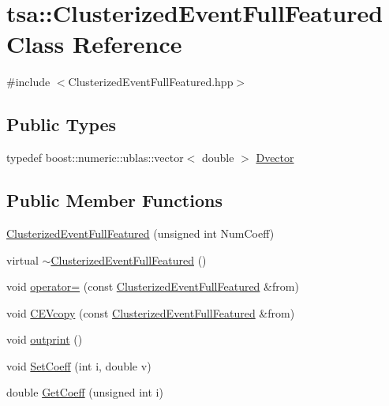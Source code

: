 \hypertarget{classtsa_1_1_clusterized_event_full_featured}{}\section{tsa\+:\+:Clusterized\+Event\+Full\+Featured Class Reference}
\label{classtsa_1_1_clusterized_event_full_featured}


{\ttfamily \#include $<$Clusterized\+Event\+Full\+Featured.\+hpp$>$}

\subsection*{Public Types}
\begin{DoxyCompactItemize}
\item 
typedef boost\+::numeric\+::ublas\+::vector$<$ double $>$ \hyperlink{classtsa_1_1_clusterized_event_full_featured_a3b6ced7b46c6d82cd122cc6c2b5c2178}{Dvector}
\end{DoxyCompactItemize}
\subsection*{Public Member Functions}
\begin{DoxyCompactItemize}
\item 
\hyperlink{classtsa_1_1_clusterized_event_full_featured_aad75a790fba5a423583707053fb8c0e8}{Clusterized\+Event\+Full\+Featured} (unsigned int Num\+Coeff)
\item 
virtual \hyperlink{classtsa_1_1_clusterized_event_full_featured_a9ccf7377b7e46b6e1b93a956cb0970ae}{$\sim$\+Clusterized\+Event\+Full\+Featured} ()
\item 
void \hyperlink{classtsa_1_1_clusterized_event_full_featured_a00c692110c58e51429e08ffdaeb63d2d}{operator=} (const \hyperlink{classtsa_1_1_clusterized_event_full_featured}{Clusterized\+Event\+Full\+Featured} \&from)
\item 
void \hyperlink{classtsa_1_1_clusterized_event_full_featured_aa727b57615697f74fb48a639b0305cd0}{C\+E\+Vcopy} (const \hyperlink{classtsa_1_1_clusterized_event_full_featured}{Clusterized\+Event\+Full\+Featured} \&from)
\item 
void \hyperlink{classtsa_1_1_clusterized_event_full_featured_ab4f718ffdf7a80ad388f2cf7359df3f8}{outprint} ()
\item 
void \hyperlink{classtsa_1_1_clusterized_event_full_featured_afd84fc016025a423c11d2febaba095c9}{Set\+Coeff} (int i, double v)
\item 
double \hyperlink{classtsa_1_1_clusterized_event_full_featured_afb655951c1bae9f57597fbe05bbea620}{Get\+Coeff} (unsigned int i)
\end{DoxyCompactItemize}
